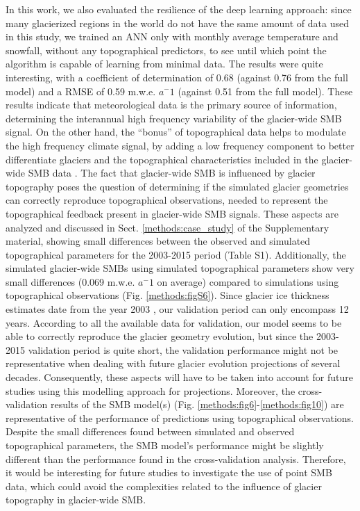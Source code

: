 In this work, we also evaluated the resilience of the deep learning approach: since many glacierized regions in the world do not have the same amount of data used in this study, we trained an ANN only with monthly average temperature and snowfall, without any topographical predictors, to see until which point the algorithm is capable of learning from minimal data. The results were quite interesting, with a coefficient of determination of 0.68 (against 0.76 from the full model) and a RMSE of 0.59 m.w.e. $a^-1$ (against 0.51 from the full model). These results indicate that meteorological data is the primary source of information, determining the interannual high frequency variability of the glacier-wide SMB signal. On the other hand, the “bonus” of topographical data helps to  modulate the high frequency climate signal, by adding a low frequency component to better differentiate glaciers and the topographical characteristics included in the glacier-wide SMB data \citep{huss_conventional_2012}. The fact that glacier-wide SMB is influenced by glacier topography poses the question of determining if the simulated glacier geometries can correctly reproduce topographical observations, needed to represent the topographical feedback present in glacier-wide SMB signals. These aspects are analyzed and discussed in Sect. \ref{methods:case_study} of the Supplementary material, showing small differences between the observed and simulated topographical parameters for the 2003-2015 period (Table S1). Additionally, the simulated glacier-wide SMBs using simulated topographical parameters show very small differences (0.069 m.w.e. $a^-1$ on average) compared to simulations using topographical observations (Fig. \ref{methods:figS6}). Since glacier ice thickness estimates date from the year 2003 \citep{farinotti_consensus_2019}, our validation period can only encompass 12 years. According to all the available data for validation, our model seems to be able to correctly reproduce the glacier geometry evolution, but since the 2003-2015 validation period is quite short, the validation performance might not be representative when dealing with future glacier evolution projections of several decades. Consequently, these aspects will have to be taken into account for future studies using this modelling approach for projections. Moreover, the cross-validation results of the SMB model(s) (Fig. \ref{methods:fig6}-\ref{methods:fig10}) are representative of the performance of predictions using topographical observations. Despite the small differences found between simulated and observed topographical parameters, the SMB model's performance might be slightly different than the performance found in the cross-validation analysis. Therefore, it would be interesting for future studies to investigate the use of point SMB data, which could avoid the complexities related to the influence of glacier topography in glacier-wide SMB. 

